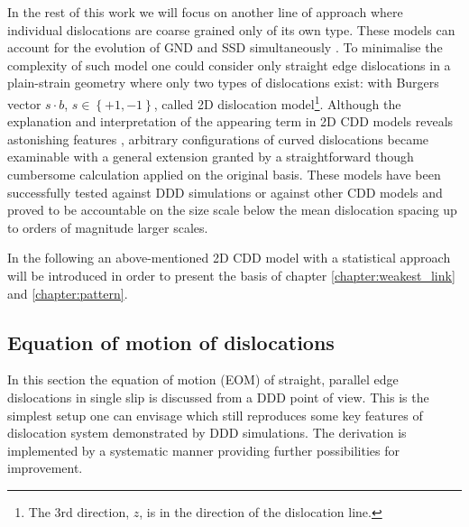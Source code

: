 In the rest of this work we will focus on another line of approach where individual dislocations are coarse grained only of its own type. These models can account for the evolution of GND and SSD simultaneously \cite{Groma_1997_PRB, Groma_2003_AM}. To minimalise the complexity of such model one could consider only straight edge dislocations in a plain-strain geometry where only two types of dislocations exist: with Burgers vector $s \cdot b$, $s \in \left\{ { +1 , -1 } \right\}$, called 2D dislocation model\footnote{The 3rd direction, $z$, is in the direction of the dislocation line.}. Although the explanation and interpretation of the appearing term in 2D CDD models \cite{Groma_2003_AM} reveals astonishing features \cite{PhysRevB.93.214110}, arbitrary configurations of curved dislocations became examinable with a general extension \cite{Hochrainer_2014_JMPS, hochrainer2007three, Stefan_2011_JMR, SANDFELD20151} granted by a straightforward though cumbersome calculation applied on the original basis. These models have been successfully tested against DDD simulations \cite{Stefan_2015_MSMSE} or against other CDD models \cite{Monavari_2016_JMPS} and proved to be accountable on the size scale below the mean dislocation spacing up to orders of magnitude larger scales.

In the following an above-mentioned 2D CDD model with a statistical approach will be introduced in order to present the basis of chapter \ref{chapter:weakest_link} and \ref{chapter:pattern}.

\subsection{Equation of motion of dislocations}
In this section the equation of motion (EOM) of straight, parallel edge dislocations in single slip is discussed from a DDD point of view. This is the simplest setup one can envisage which still reproduces some key features of dislocation system demonstrated by DDD simulations. The derivation is implemented by a systematic manner providing further possibilities for improvement.


